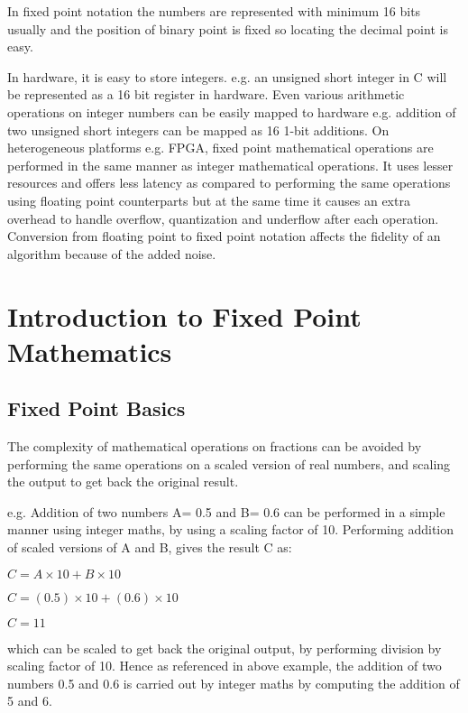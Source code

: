 \vspace{0.25cm}
\noindent In fixed point notation the numbers are represented with minimum 16 bits usually and the position of binary point is fixed so locating the decimal point is easy.

\vspace{0.25cm}
 \noindent In hardware, it is easy to store integers. e.g. an unsigned short integer in C will be represented as a 16 bit register in hardware. Even various arithmetic operations on integer numbers can be easily mapped to hardware e.g. addition of two unsigned short integers can be mapped as 16 1-bit additions. On heterogeneous platforms e.g. FPGA, fixed point mathematical operations are performed in the same manner as integer mathematical operations. It uses lesser resources and offers less latency as compared to performing the same operations using floating point counterparts but at the same time it causes an extra overhead to handle overflow, quantization and underflow after each operation. Conversion from floating point to fixed point notation affects the fidelity of an algorithm because of the added noise.

\section{Introduction to Fixed Point Mathematics}
\subsection{Fixed Point Basics}
The complexity of mathematical operations on fractions can be avoided by performing the same operations on a scaled version of real numbers, and scaling the output to get back the original result.

\vspace{0.25cm}
\noindent e.g. Addition of two numbers A= 0.5 and B= 0.6  can be performed in a simple manner using integer maths, by using a scaling factor of 10. Performing addition of scaled versions of A and B, gives the result C as:

\noindent$C= A\times 10+ B\times 10$ 

\noindent $C= (0.5)\times 10+ (0.6)\times 10$

\noindent $C=11$

\noindent which can be scaled to get back the original output, by performing division by scaling factor of 10. Hence as referenced in above example, the addition of two numbers 0.5 and 0.6 is carried out by integer maths by computing the addition of 5 and 6.

